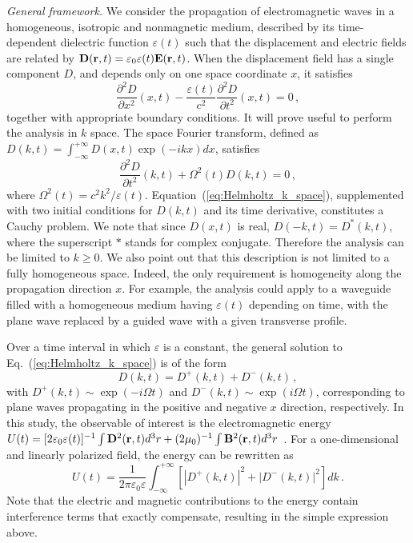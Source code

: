 \documentclass[ prl, twocolumn, superscriptaddress, amsfonts, amsmath,floatfix]{revtex4-1}
\newcommand{\rg}{{\bf r}}
\newcommand{\Eg}{{\bf E}}
\newcommand{\Bg}{{\bf B}}
\newcommand{\Dg}{{\bf D}}
\begin{document}
{\it General framework.}
We consider the propagation of electromagnetic waves in a homogeneous, isotropic and nonmagnetic medium, described by its time-dependent dielectric function $\varepsilon(t)$ such that the displacement and electric fields are related by $\Dg(\rg,t) = \varepsilon_0 \varepsilon(t) \Eg(\rg,t)$. When the displacement field has a single component $D$, and depends only on one space coordinate $x$, it satisfies
\begin{equation}
\frac{\partial^2 D}{\partial x^2}(x,t) - \frac{\varepsilon(t)}{c^2} \frac{\partial^2 D}{\partial t^2}(x,t) = 0 \, ,
\label{eq:wave_1D}
\end{equation}
together with appropriate boundary conditions. It will prove useful to perform the analysis in $k$ space. The space Fourier transform, defined as $D(k,t) = \int_{-\infty}^{+\infty} D(x,t)  \exp(-ikx) dx$, satisfies
\begin{equation}
\frac{\partial^2 D}{\partial t^2}(k,t) + \Omega^2(t) D(k,t) = 0 \, ,
\label{eq:Helmholtz_k_space}
\end{equation}
where $\Omega^2(t) = c^2 k^2/\varepsilon(t)$. Equation~(\ref{eq:Helmholtz_k_space}), supplemented with two initial conditions for $D(k,t)$ and its time derivative, constitutes a Cauchy problem. We note that since $D(x,t)$ is real, $D(-k,t)=D^*(k,t)$, where the superscript $*$ stands for complex conjugate. Therefore the analysis can be limited to $k \geq 0$. {We also point out that this description is not limited to a fully homogeneous space. Indeed, the only requirement is homogeneity along the propagation direction $x$. For example, the analysis could apply to a waveguide filled with a homogeneous medium having $\varepsilon(t)$ depending on time, with the plane wave replaced by a guided wave with a given transverse profile.}

Over a time interval in which $\varepsilon$ is a constant, the general solution to Eq.~(\ref{eq:Helmholtz_k_space}) is of the form
\begin{equation}
D(k,t) = D^+(k,t) + D^-(k,t) \, ,
\label{eq:solution_Helm_Fourier}
\end{equation}
with $D^+(k,t) \sim \exp(-i\Omega t)$ and $D^-(k,t) \sim\exp(i\Omega t)$, corresponding to plane waves propagating in the positive and negative $x$ direction, respectively. In this study, the observable of interest is the electromagnetic energy 
$U(t) =[2 \varepsilon_0 \varepsilon(t)]^{-1} \int \Dg^2(\rg,t) d^3 r +  (2 \mu_0)^{-1} \int \Bg^2(\rg,t) d^3 r$~\cite{Landau_Book}.
For a one-dimensional and linearly polarized field, the energy can be rewritten as
\begin{equation}
U(t) = \frac{1}{2\pi\varepsilon_0 \varepsilon} \int_{-\infty}^{+\infty} \left [ |D^+(k,t)|^2 +  |D^-(k,t)|^2 \right ] dk  \, .
\label{eq:energy_def}
\end{equation}
Note that the electric and magnetic contributions to the energy contain interference terms that exactly compensate, resulting in the simple expression above. 
\end{document}
